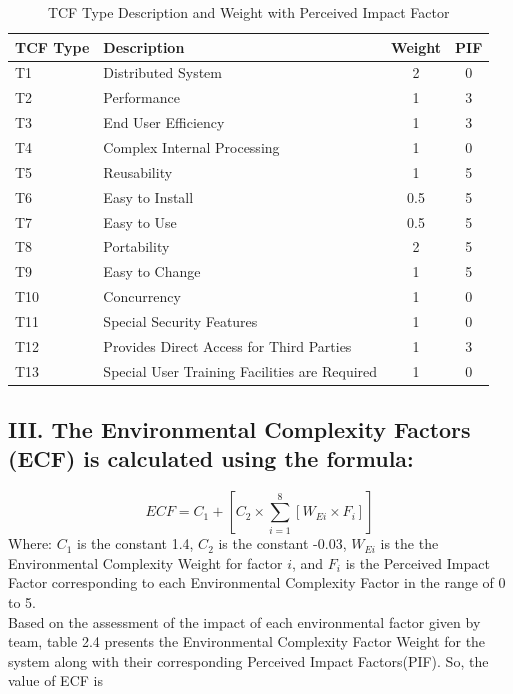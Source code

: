 \documentclass[english,12pt,a4paper]{report}
\begin{document}
		
		\begin{table}[htbp]
			\centering
			\begin{tabular}{@{}llcc@{}}
				\toprule
				TCF Type & Description & Weight & PIF \\ 
				\midrule
				T1 & Distributed System & 2 & 0\\ 
				T2 & Performance & 1 & 3\\ 
				T3 & End User Efficiency & 1 & 3\\ 
				T4 & Complex Internal Processing & 1 & 0\\ 
				T5 & Reusability & 1 & 5\\ 
				T6 & Easy to Install & 0.5 & 5\\ 
				T7 & Easy to Use & 0.5 & 5\\ 
				T8 & Portability & 2 & 5\\ 
				T9 & Easy to Change & 1 & 5\\ 
				T10 & Concurrency & 1 & 0\\ 
				T11 & Special Security Features & 1 & 0\\ 
				T12 & Provides Direct Access for Third Parties & 1 & 3\\ 
				T13 & Special User Training Facilities are Required & 1 & 0\\ 
				\bottomrule
			\end{tabular}
			\caption{TCF Type Description and Weight with Perceived Impact Factor}
			\label{tab:tcf_table}
		\end{table}
		
		
		
		\subsection*{III. The Environmental Complexity Factors (ECF) is calculated using the formula:}
		\begin{equation}
			ECF = C_{1} + \left[C_{2} \times \sum_{i=1}^{8} \left[W_{Ei} \times F_i\right]\right]
		\end{equation}
		Where:
		\( C_{1} \) is the constant 1.4,
		\( C_{2} \) is the constant -0.03,
		\( W_{Ei} \) is the the Environmental Complexity Weight for factor \( i \), and
		\( F_i \) is the Perceived Impact Factor corresponding to each Environmental Complexity Factor in the range of 0 to 5. \\
		Based on the assessment of the impact of each environmental factor given by team, table 2.4 presents the Environmental Complexity Factor Weight for the system along with their corresponding Perceived Impact Factors(PIF). So, the value of ECF is
		
\end{document}
